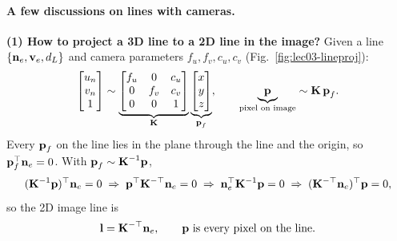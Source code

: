 \paragraph{A few discussions on lines with cameras.}

\textbf{(1) How to project a 3D line to a 2D line in the image?} Given a line $\{\boldsymbol{\mathbf{n}}_e,\boldsymbol{\mathbf{v}}_e,d_L\}$ and camera parameters $f_u,f_v,c_u,c_v$ (Fig.~\ref{fig:lec03-lineproj}):
\begin{align}
\begin{bmatrix} u_n \\ v_n \\ 1 \end{bmatrix} \sim \underbrace{\begin{bmatrix} f_u & 0 & c_u \\ 0 & f_v & c_v \\ 0 & 0 & 1 \end{bmatrix}}_{\boldsymbol{\mathbf{K}}}\underbrace{\begin{bmatrix} x \\ y \\ z \end{bmatrix}}_{\boldsymbol{\mathbf{p}}_f}, \qquad
\underbrace{\boldsymbol{\mathbf{p}}}_{\text{pixel on image}} \sim \boldsymbol{\mathbf{K}}\,\boldsymbol{\mathbf{p}}_f.
\end{align}
Every $\boldsymbol{\mathbf{p}}_f$ on the line lies in the plane through the line and the origin, so $\boldsymbol{\mathbf{p}}_f^\top\boldsymbol{\mathbf{n}}_e = 0$. With $\boldsymbol{\mathbf{p}}_f \sim \boldsymbol{\mathbf{K}}^{-1}\boldsymbol{\mathbf{p}}$,
\begin{align}
(\boldsymbol{\mathbf{K}}^{-1}\boldsymbol{\mathbf{p}})^\top\boldsymbol{\mathbf{n}}_e = 0 \;\Rightarrow\; \boldsymbol{\mathbf{p}}^\top\boldsymbol{\mathbf{K}}^{-\top}\boldsymbol{\mathbf{n}}_e = 0 \;\Rightarrow\; \boldsymbol{\mathbf{n}}_e^\top\boldsymbol{\mathbf{K}}^{-1}\boldsymbol{\mathbf{p}} = 0 \;\Rightarrow\; (\boldsymbol{\mathbf{K}}^{-\top}\boldsymbol{\mathbf{n}}_e)^\top\boldsymbol{\mathbf{p}} = 0,
\end{align}
so the 2D image line is
\begin{align}
\boldsymbol{\mathbf{l}} = \boldsymbol{\mathbf{K}}^{-\top}\boldsymbol{\mathbf{n}}_e, \qquad \boldsymbol{\mathbf{p}} \text{ is every pixel on the line}.
\end{align}

